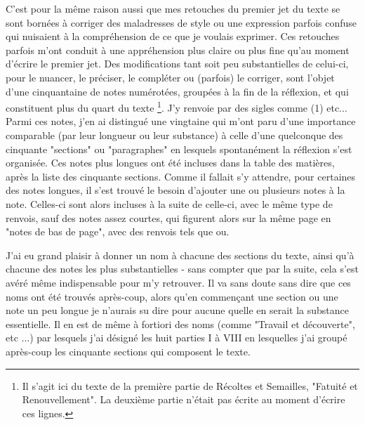 C'est pour la même raison aussi que mes retouches du premier jet du texte se sont bornées à corriger des maladresses de style ou une expression parfois confuse qui nuisaient à la compréhension de ce que je voulais exprimer. Ces retouches parfois m'ont conduit à une appréhension plus claire ou plus fine qu'au moment d'écrire le premier jet. Des modifications tant soit peu substantielles de celui-ci, pour le nuancer, le préciser, le compléter ou (parfois) le corriger, sont l'objet d'une cinquantaine de notes numérotées, groupées à la fin de la réflexion, et qui constituent plus du quart du texte \footnote{Il s'agit ici du texte de la première partie de Récoltes et Semailles, "Fatuité et Renouvellement". La deuxième partie n'était pas écrite au moment d'écrire ces lignes.}. J'y renvoie par des sigles comme (1) etc... Parmi ces notes, j'en ai distingué une vingtaine qui m'ont paru d'une importance comparable (par leur longueur ou leur substance) à celle d'une quelconque des cinquante "sections" ou "paragraphes" en lesquels spontanément la réflexion s'est organisée. Ces notes plus longues ont été incluses dans la table des matières, après la liste des cinquante sections. Comme il fallait s'y attendre, pour certaines des notes longues, il s'est trouvé le besoin d'ajouter une ou plusieurs notes à la note. Celles-ci sont alors incluses à la suite de celle-ci, avec le même type de renvois, sauf des notes assez courtes, qui figurent alors sur la même page en "notes de bas de page", avec des renvois tels que ou.

J'ai eu grand plaisir à donner un nom à chacune des sections du texte, ainsi qu'à chacune des notes les plus substantielles - sans compter que par la suite, cela s'est avéré même indispensable pour m'y retrouver. Il va sans doute sans dire que ces noms ont été trouvés après-coup, alors qu'en commençant une section ou une note un peu longue je n'aurais su dire pour aucune quelle en serait la substance essentielle. Il en est de même à fortiori des noms (comme "Travail et découverte", etc ...) par lesquels j'ai désigné les huit parties I à VIII en lesquelles j'ai groupé après-coup les cinquante sections qui composent le texte.

